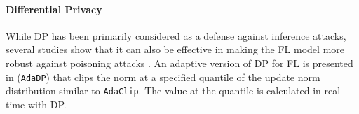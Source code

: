 \paragraph{Differential Privacy}
While DP has been primarily considered as a defense against inference attacks, several studies show that it can also be effective in making the FL model more robust against poisoning attacks \cite{10.5555/3489212.3489304, sun2019really, naseri2022local, NEURIPS2020_fc4ddc15, ijcai2019p657}. An adaptive version of DP for FL is presented in \cite{NEURIPS2021_91cff01a} (\verb+AdaDP+) that clips the norm at a specified quantile of the update norm distribution similar to \verb+AdaClip+. The value at the quantile is calculated in real-time with DP.









